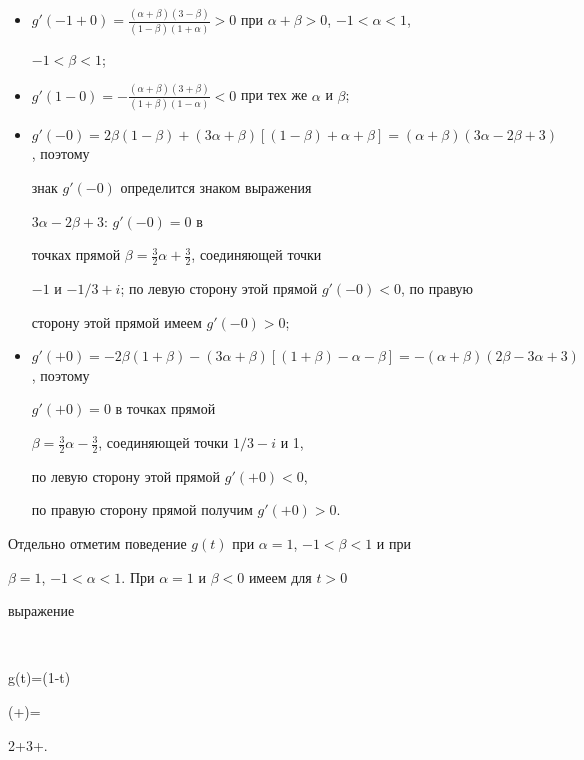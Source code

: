 \begin{itemize}


\item[1)] $g'(-1+0)=\frac{(\alpha+\beta)(3-\beta)}


{(1-\beta)(1+\alpha)}>0$ при $\alpha+\beta>0$, $-1<\alpha<1$,


$-1<\beta<1$;


\item[2)] $g'(1-0)=-\frac{(\alpha+\beta)(3+\beta)}


{(1+\beta)(1-\alpha)}<0$ при тех же $\alpha$ и $\beta$;


\item[3)] $g'(-0)=2\beta(1-\beta)+(3\alpha+\beta)[(1-\beta)+


\alpha+\beta]=(\alpha+\beta)(3\alpha-2\beta+3)$, поэтому


знак $g'(-0)$ определится знаком выражения


$3\alpha-2\beta+3$: $g'(-0)=0$ в


точках прямой $\beta=\frac{3}{2}\alpha+\frac{3}{2}$, соединяющей точки


$-1$ и $-1/3+i$; по левую сторону этой прямой $g'(-0)<0$, по правую


сторону этой прямой имеем $g'(-0)>0$;


\item[4)] $g'(+0)=-2\beta(1+\beta)-(3\alpha+\beta)[(1+\beta)-


\alpha-\beta]=-(\alpha+\beta)(2\beta-3\alpha+3)$, поэтому


$g'(+0)=0$ в точках прямой


$\beta=\frac{3}{2}\alpha-\frac{3}{2}$, соединяющей точки $1/3-i$ и 1,


по левую сторону этой прямой $g'(+0)<0$,


по правую сторону прямой получим $g'(+0)>0$.


\end{itemize}





Отдельно отметим поведение $g(t)$ при $\alpha=1$, $-1<\beta<1$ и при


$\beta=1$, $-1<\alpha<1$. При $\alpha=1$ и $\beta<0$ имеем для $t>0$


выражение


$$


g(t)=(1-t)


\biggl(+\biggr)=


2\beta{}+3+\beta.


